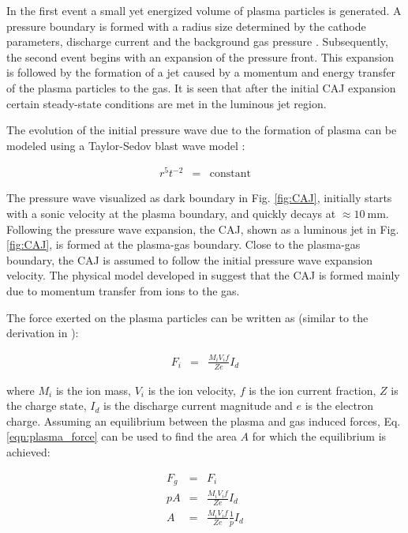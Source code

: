 \documentclass[a4paper]{iacas}%
\begin{document}
In the first event a small yet energized volume of plasma particles is generated. A pressure boundary is formed with a radius size determined by the cathode parameters, discharge current and the background gas pressure \cite{boxman1990momentum}.
Subsequently, the second event begins with an expansion of the pressure front. This expansion is followed by the formation of a jet caused by a momentum and energy transfer of the plasma particles to the gas. It is seen that after the initial CAJ expansion certain steady-state conditions are met in the luminous jet region. 

The evolution of the initial pressure wave due to the formation of plasma can be modeled using a Taylor-Sedov blast wave model \cite{TAYLOR,SEDOV}: 

\begin{eqnarray}\label{eqn:taylor_sedov}
r^5 t^{-2} &=& \mathrm{constant}
\end{eqnarray}

\noindent The pressure wave visualized as dark boundary in Fig. \ref{fig:CAJ}, initially starts with a sonic velocity at the plasma boundary, and quickly decays at $\approx 10~\mathrm{mm}$. Following the pressure wave expansion, the CAJ, shown as a luminous jet in Fig. \ref{fig:CAJ}, is formed at the plasma-gas boundary. Close to the plasma-gas boundary, the CAJ is assumed to follow the initial pressure wave expansion velocity. The physical model developed in \cite{KRClose} suggest that the CAJ is formed mainly due to momentum transfer from ions to the gas.


The force exerted on the plasma particles can be written as (similar to the derivation in \cite{boxman1990momentum}):

\begin{eqnarray}\label{eqn:plasma_force}
	F_i &= &\frac{M_i V_i f}{Z e} I_d
\end{eqnarray}

\noindent where $M_i$ is the ion mass, $V_i$ is the ion velocity, $f$ is the ion current fraction, $Z$ is the charge state, $I_d$ is the discharge current magnitude and $e$ is the electron charge.
Assuming an equilibrium between the plasma and gas induced forces, Eq. \eqref{eqn:plasma_force} can be used to find the area $A$ for which the equilibrium is achieved:

\begin{eqnarray}\label{eqn:rel_equiv_force}
	F_g & = & F_i \\
	p A & = & \frac{M_i V_i f}{Z e} I_d\\
	A & = & \frac{M_i V_i f}{Z e} \frac{1}{p} I_d
\end{eqnarray}
\end{document}
